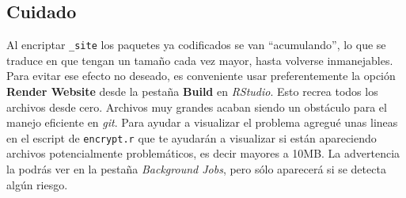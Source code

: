 \documentclass[
  letterpaper,
  DIV=11,
  numbers=noendperiod]{scrartcl}
\begin{document}
\subsection{Cuidado}\label{cuidado}

Al encriptar \texttt{\_site} los paquetes ya codificados se van
``acumulando'', lo que se traduce en que tengan un tamaño cada vez
mayor, hasta volverse inmanejables. Para evitar ese efecto no deseado,
es conveniente usar preferentemente la opción \textbf{Render Website}
desde la pestaña \textbf{Build} en \emph{RStudio}. Esto recrea todos los
archivos desde cero. Archivos muy grandes acaban siendo un obstáculo
para el manejo eficiente en \emph{git}. Para ayudar a visualizar el
problema agregué unas lineas en el escript de \texttt{encrypt.r} que te
ayudarán a visualizar si están apareciendo archivos potencialmente
problemáticos, es decir mayores a 10MB. La advertencia la podrás ver en
la pestaña \emph{Background Jobs}, pero sólo aparecerá si se detecta
algún riesgo.
\end{document}
